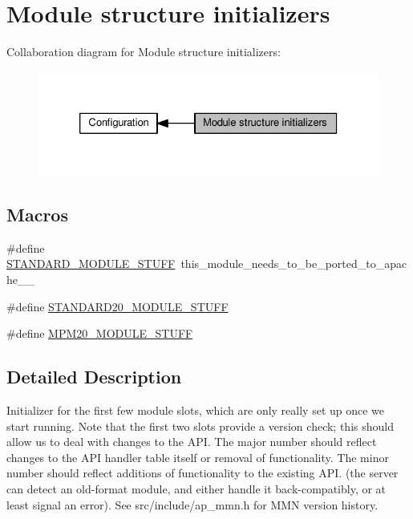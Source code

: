 \hypertarget{group__ModuleInit}{}\section{Module structure initializers}
\label{group__ModuleInit}
Collaboration diagram for Module structure initializers\+:
\nopagebreak
\begin{figure}[H]
\begin{center}
\leavevmode
\includegraphics[width=326pt]{group__ModuleInit}
\end{center}
\end{figure}
\subsection*{Macros}
\begin{DoxyCompactItemize}
\item 
\#define \hyperlink{group__ModuleInit_gad732770e2b297b8a12d91a2d636d420c}{S\+T\+A\+N\+D\+A\+R\+D\+\_\+\+M\+O\+D\+U\+L\+E\+\_\+\+S\+T\+U\+FF}~this\+\_\+module\+\_\+needs\+\_\+to\+\_\+be\+\_\+ported\+\_\+to\+\_\+apache\+\_\+\_
\item 
\#define \hyperlink{group__ModuleInit_ga852c139212175cbc1e47a608a198da13}{S\+T\+A\+N\+D\+A\+R\+D20\+\_\+\+M\+O\+D\+U\+L\+E\+\_\+\+S\+T\+U\+FF}
\item 
\#define \hyperlink{group__ModuleInit_ga4b6f78d2b0b5f8786dd2504558034332}{M\+P\+M20\+\_\+\+M\+O\+D\+U\+L\+E\+\_\+\+S\+T\+U\+FF}
\end{DoxyCompactItemize}


\subsection{Detailed Description}
Initializer for the first few module slots, which are only really set up once we start running. Note that the first two slots provide a version check; this should allow us to deal with changes to the A\+PI. The major number should reflect changes to the A\+PI handler table itself or removal of functionality. The minor number should reflect additions of functionality to the existing A\+PI. (the server can detect an old-\/format module, and either handle it back-\/compatibly, or at least signal an error). See src/include/ap\+\_\+mmn.\+h for M\+MN version history. 


